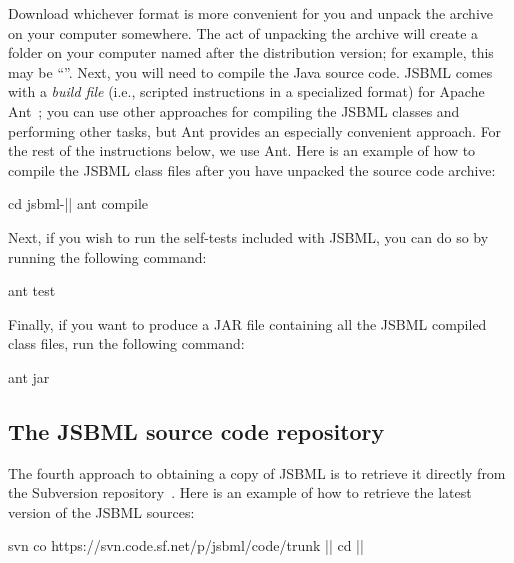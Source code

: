 Download whichever format is more convenient for you and unpack the archive
on your computer somewhere.  The act of unpacking the archive will create a
folder on your computer named after the distribution version; for
example, this may be ``\jsbmlversion''.  Next, you will need to compile
the Java source code.  JSBML comes with a \emph{build file} (i.e., scripted
instructions in a specialized format) for Apache Ant~\citep{ApacheAnt};
you can use other approaches for compiling the JSBML classes and
performing other tasks, but Ant provides an especially convenient approach.
For the rest of the instructions below, we use Ant.  Here is an example of
how to compile the JSBML class files after you have unpacked the source
code archive:

\begin{example}[style=bash, title={Compiling JSBML with Ant; this example
    uses Bash shell syntax.}] 
cd jsbml-|\jsbmlversion|
ant compile
\end{example}

Next, if you wish to run the self-tests included with JSBML, you can do so by
running the following command:

\begin{example}[style=bash, title={Running the unit tests provided with JSBML.}]
ant test
\end{example}

Finally, if you want to produce a JAR file containing all the JSBML
compiled class files, run the following command:

\begin{example}[style=bash, title={Creating a JAR file.}]
ant jar
\end{example}



\subsection{The JSBML source code repository}
\label{sec:SourceDistribution}

The fourth approach to obtaining a copy of JSBML is to retrieve it directly
from the Subversion repository~\cite{JSBMLSVN}.  Here is an example of how
to retrieve the latest version of the JSBML sources:

\newcommand{\dirname}{\code{\emph{\color{winered}jsbml}}\xspace}

\begin{example}[style=bash, title={Downloading the latest JSBML 
    sources from the JSBML project's Subversion repository.}]
svn co https://svn.code.sf.net/p/jsbml/code/trunk |\dirname|
cd |\dirname|
\end{example}

